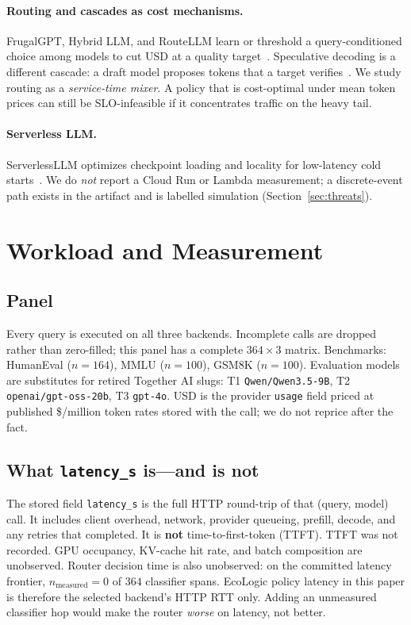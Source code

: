 \documentclass[10pt,conference]{IEEEtran}
\begin{document}
\paragraph{Routing and cascades as cost mechanisms.}
FrugalGPT, Hybrid LLM, and RouteLLM learn or threshold a query-conditioned choice among models to cut USD at a quality target~\cite{chen2023frugalgpt,ding2024hybridllm,ong2024routellm}. Speculative decoding is a different cascade: a draft model proposes tokens that a target verifies~\cite{leviathan2023speculative}. We study routing as a \emph{service-time mixer}. A policy that is cost-optimal under mean token prices can still be SLO-infeasible if it concentrates traffic on the heavy tail.

\paragraph{Serverless LLM.}
ServerlessLLM optimizes checkpoint loading and locality for low-latency cold starts~\cite{fu2024serverlessllm}. We do \emph{not} report a Cloud Run or Lambda measurement; a discrete-event path exists in the artifact and is labelled simulation (Section~\ref{sec:threats}).

\section{Workload and Measurement}

\subsection{Panel}
Every query is executed on all three backends. Incomplete calls are dropped rather than zero-filled; this panel has a complete $364\times 3$ matrix. Benchmarks: HumanEval ($n{=}164$), MMLU ($n{=}100$), GSM8K ($n{=}100$). Evaluation models are substitutes for retired Together AI slugs: T1 \texttt{Qwen/Qwen3.5-9B}, T2 \texttt{openai/gpt-oss-20b}, T3 \texttt{gpt-4o}. USD is the provider \texttt{usage} field priced at published \$/million token rates stored with the call; we do not reprice after the fact.

\subsection{What \texttt{latency\_s} is---and is not}
The stored field \texttt{latency\_s} is the full HTTP round-trip of that (query, model) call. It includes client overhead, network, provider queueing, prefill, decode, and any retries that completed. It is \textbf{not} time-to-first-token (TTFT). TTFT was not recorded. GPU occupancy, KV-cache hit rate, and batch composition are unobserved. Router decision time is also unobserved: on the committed latency frontier, $n_{\mathrm{measured}}{=}0$ of $364$ classifier spans. EcoLogic policy latency in this paper is therefore the selected backend's HTTP RTT only. Adding an unmeasured classifier hop would make the router \emph{worse} on latency, not better.
\end{document}
